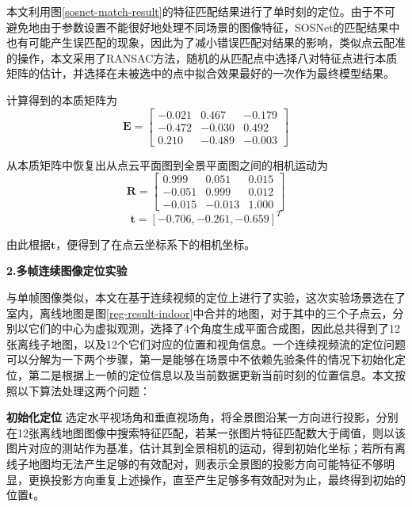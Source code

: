 本文利用图\ref{sosnet-match-result}的特征匹配结果进行了单时刻的定位。由于不可避免地由于参数设置不能很好地处理不同场景的图像特征，SOSNet的匹配结果中也有可能产生误匹配的现象，因此为了减小错误匹配对结果的影响，类似点云配准的操作，本文采用了RANSAC方法，随机的从匹配点中选择八对特征点进行本质矩阵的估计，并选择在未被选中的点中拟合效果最好的一次作为最终模型结果。

计算得到的本质矩阵为
\begin{equation*}
	\boldsymbol{E} = 
	\begin{bmatrix}
		-0.021 & 0.467 & -0.179\\
		-0.472 & -0.030 & 0.492\\
		0.210 & -0.489 & -0.003
	\end{bmatrix}
\end{equation*}

从本质矩阵中恢复出从点云平面图到全景平面图之间的相机运动为
\begin{equation*}
	\boldsymbol{R} = 
	\begin{bmatrix}
		0.999 & 0.051 & 0.015 \\
		-0.051 & 0.999 & 0.012\\
		-0.015 & -0.013 & 1.000
	\end{bmatrix}
\end{equation*}
\begin{equation*}
	\boldsymbol{t}=[-0.706, -0.261, -0.659]^T
\end{equation*}

由此根据$\boldsymbol{t}$，便得到了在点云坐标系下的相机坐标。

\textbf{2.多帧连续图像定位实验}

与单帧图像类似，本文在基于连续视频的定位上进行了实验，这次实验场景选在了室内，离线地图是图\ref{reg-result-indoor}中合并的地图，对于其中的三个子点云，分别以它们的中心为虚拟观测，选择了4个角度生成平面合成图，因此总共得到了12张离线子地图，以及12个它们对应的位置和视角信息。一个连续视频流的定位问题可以分解为一下两个步骤，第一是能够在场景中不依赖先验条件的情况下初始化定位，第二是根据上一帧的定位信息以及当前数据更新当前时刻的位置信息。本文按照以下算法处理这两个问题：

\textbf{初始化定位} \quad 选定水平视场角和垂直视场角，将全景图沿某一方向进行投影，分别在12张离线地图图像中搜索特征匹配，若某一张图片特征匹配数大于阈值，则以该图片对应的测站作为基准，估计其到全景相机的运动，得到初始化坐标；若所有离线子地图均无法产生足够的有效配对，则表示全景图的投影方向可能特征不够明显，更换投影方向重复上述操作，直至产生足够多有效配对为止，最终得到初始的位置$\boldsymbol{t}$。


